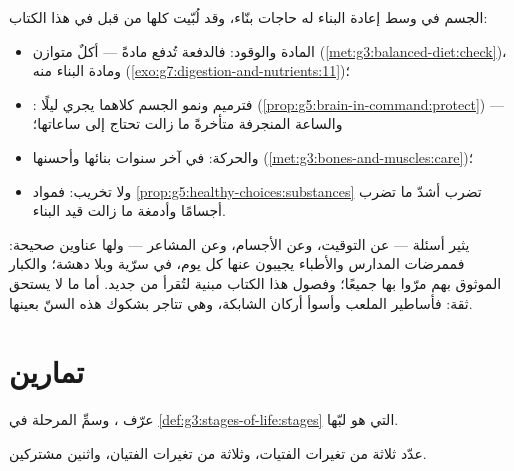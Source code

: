 \begin{proposition}\label{prop:g8:puberty:care}
الجسم في وسط إعادة البناء له حاجات بنّاء، وقد لُبّيت كلها من قبل في
هذا الكتاب:
\begin{itemize}
  \item المادة والوقود: فالدفعة تُدفع مادةً --- أكلٌ متوازن
        (\cref{met:g3:balanced-diet:check})، ومادة البناء منه
        (\cref{exo:g7:digestion-and-nutrients:11})؛
  \item {}: فترميم  ونمو الجسم كلاهما يجري ليلًا
        (\cref{prop:g5:brain-in-command:protect}) --- والساعة
        المنجرفة متأخرةً ما زالت تحتاج إلى ساعاتها؛
  \item والحركة:   في آخر سنوات بنائها وأحسنها
        (\cref{met:g3:bones-and-muscles:care})؛
  \item ولا تخريب: فمواد
        \cref{prop:g5:healthy-choices:substances} تضرب أشدّ ما
        تضرب أجسامًا وأدمغة ما زالت قيد
        البناء.
\end{itemize}
\end{proposition}
\admitted

\begin{example}\label{ex:g8:puberty:questions}
 يثير أسئلة --- عن التوقيت، وعن الأجسام، وعن المشاعر --- ولها
عناوين صحيحة: فممرضات المدارس والأطباء يجيبون عنها كل يوم، في سرّية
وبلا دهشة؛ والكبار الموثوق بهم مرّوا بها جميعًا؛ وفصول هذا الكتاب
مبنية لتُقرأ من جديد. أما ما لا يستحق ثقة: فأساطير الملعب وأسوأ
أركان الشابكة، وهي تتاجر بشكوك هذه السنّ بعينها.
\end{example}

\section{تمارين}

\begin{exercise}[$\star$]\label{exo:g8:puberty:1}
عرّف ، وسمِّ المرحلة في \cref{def:g3:stages-of-life:stages}
التي هو لبّها.
\end{exercise}

\begin{exercise}[$\star$]\label{exo:g8:puberty:2}
عدّد ثلاثة من تغيرات  الفتيات، وثلاثة من تغيرات الفتيان،
واثنين مشتركين.
\end{exercise}

